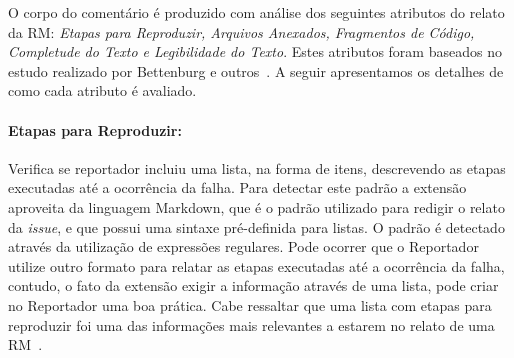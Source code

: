 \begin{table}[htpb]
\centering
{}
\caption{Critérios de aceitação e forma de análise utilizados na análise de
    qualidade do relato.}
\label{tab:criterios_analise_qualidade_relato}
\end{table}

O corpo do comentário é produzido com análise dos seguintes atributos do relato
da RM\@: \textit{Etapas para Reproduzir, Arquivos Anexados, Fragmentos de
    Código, Completude do Texto e Legibilidade do Texto}. Estes atributos foram
baseados no estudo realizado por Bettenburg e outros~\cite{bettenburg2008makes}.
A seguir apresentamos os detalhes de como cada atributo é avaliado.

\paragraph{Etapas para Reproduzir:}
\label{par:etapas_para_reproduzir_}

Verifica se reportador incluiu uma lista, na forma de itens, descrevendo as
etapas executadas até a ocorrência da falha. Para detectar este padrão a
extensão aproveita da linguagem Markdown, que é o padrão utilizado para redigir
o relato da \textit{issue}, e que possui uma sintaxe pré-definida para listas. O
padrão é detectado através da utilização de expressões regulares. Pode ocorrer
que o Reportador utilize outro formato para relatar as etapas executadas até a
ocorrência da falha, contudo, o fato da extensão exigir a informação através de
uma lista, pode criar no Reportador uma boa prática. Cabe ressaltar que uma
lista com etapas para reproduzir foi uma das informações mais relevantes a
estarem no relato de uma RM~\cite{bettenburg2008makes}.

